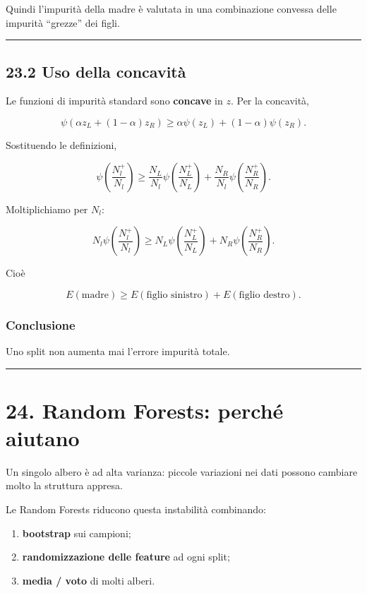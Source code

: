 \documentclass{article}
\providecommand{\tightlist}{%
  \setlength{\itemsep}{0pt}\setlength{\parskip}{0pt}}
\begin{document}
Quindi l'impurità della madre è valutata in una combinazione convessa
delle impurità ``grezze'' dei figli.

\begin{center}\rule{0.5\linewidth}{0.5pt}\end{center}

\subsection{23.2 Uso della concavità}\label{uso-della-concavituxe0}

Le funzioni di impurità standard sono \textbf{concave} in \(z\). Per la
concavità,

\[
\psi(\alpha z_L + (1-\alpha)z_R)
\ge
\alpha\psi(z_L)+(1-\alpha)\psi(z_R).
\]

Sostituendo le definizioni,

\[
\psi\left(\frac{N_l^+}{N_l}\right)
\ge
\frac{N_L}{N_l}\psi\left(\frac{N_L^+}{N_L}\right)
+
\frac{N_R}{N_l}\psi\left(\frac{N_R^+}{N_R}\right).
\]

Moltiplichiamo per \(N_l\):

\[
N_l\psi\left(\frac{N_l^+}{N_l}\right)
\ge
N_L\psi\left(\frac{N_L^+}{N_L}\right)
+
N_R\psi\left(\frac{N_R^+}{N_R}\right).
\]

Cioè

\[
E(\text{madre}) \ge E(\text{figlio sinistro}) + E(\text{figlio destro}).
\]

\subsubsection{Conclusione}\label{conclusione-13}

Uno split non aumenta mai l'errore impurità totale.

\begin{center}\rule{0.5\linewidth}{0.5pt}\end{center}

\section{24. Random Forests: perché
aiutano}\label{random-forests-perchuxe9-aiutano}

Un singolo albero è ad alta varianza: piccole variazioni nei dati
possono cambiare molto la struttura appresa.

Le Random Forests riducono questa instabilità combinando:

\begin{enumerate}
\def\labelenumi{\arabic{enumi}.}
\tightlist
\item
  \textbf{bootstrap} sui campioni;
\item
  \textbf{randomizzazione delle feature} ad ogni split;
\item
  \textbf{media / voto} di molti alberi.
\end{enumerate}
\end{document}
